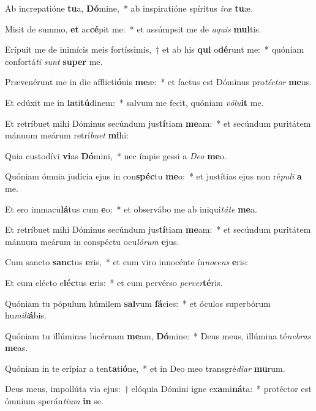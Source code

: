 \item Ab increpatióne \textbf{tu}a, \textbf{Dó}mine,~* ab inspiratióne spíritus \textit{i}\textit{ræ} \textbf{tu}æ.
\item Misit de summo, \textbf{et} ac\textbf{cé}pit me:~* et assúmpsit me de \textit{a}\textit{quis} \textbf{mul}tis.
\item Erípuit me de inimícis meis fortíssimis,~† et ab his \textbf{qui} o\textbf{dé}runt me:~* quóniam confortá\textit{ti} \textit{sunt} \textbf{su}\textbf{per} me.
\item Prævenérunt me in die afflicti\textbf{ó}nis \textbf{me}æ:~* et factus est Dóminus pro\textit{téc}\textit{tor} \textbf{me}us.
\item Et edúxit me in \textbf{la}ti\textbf{tú}dinem:~* salvum me fecit, quóniam \textit{vó}\textit{lu}\textbf{it} me.
\item Et retríbuet mihi Dóminus secúndum jus\textbf{tí}tiam \textbf{me}am:~* et secúndum puritátem mánuum meárum retrí\textit{bu}\textit{et} \textbf{mi}hi:
\item Quia custodívi \textbf{vi}as \textbf{Dó}mini,~* nec ímpie gessi a \textit{De}\textit{o} \textbf{me}o.
\item Quóniam ómnia judícia ejus in con\textbf{spéc}tu \textbf{me}o:~* et justítias ejus non ré\textit{pu}\textit{li} \textbf{a} me.
\item Et ero immacu\textbf{lá}tus cum \textbf{e}o:~* et observábo me ab iniqui\textit{tá}\textit{te} \textbf{me}a.
\item Et retríbuet mihi Dóminus secúndum jus\textbf{tí}tiam \textbf{me}am:~* et secúndum puritátem mánuum meárum in conspéctu ocu\textit{ló}\textit{rum} \textbf{e}jus.
\item Cum sancto \textbf{sanc}tus \textbf{e}ris,~* et cum viro innocénte ín\textit{no}\textit{cens} \textbf{e}ris:
\item Et cum elécto e\textbf{léc}tus \textbf{e}ris:~* et cum pervérso \textit{per}\textit{ver}\textbf{té}ris.
\item Quóniam tu pópulum húmilem \textbf{sal}vum \textbf{fá}cies:~* et óculos superbórum hu\textit{mi}\textit{li}\textbf{á}bis.
\item Quóniam tu illúminas lucérnam \textbf{me}am, \textbf{Dó}mine:~* Deus meus, illúmina té\textit{ne}\textit{bras} \textbf{me}as.
\item Quóniam in te erípiar a ten\textbf{ta}ti\textbf{ó}ne,~* et in Deo meo transgré\textit{di}\textit{ar} \textbf{mu}rum.
\item Deus meus, impollúta via ejus:~† elóquia Dómini igne ex\textbf{a}mi\textbf{ná}ta:~* protéctor est ómnium sperán\textit{ti}\textit{um} \textbf{in} se.

